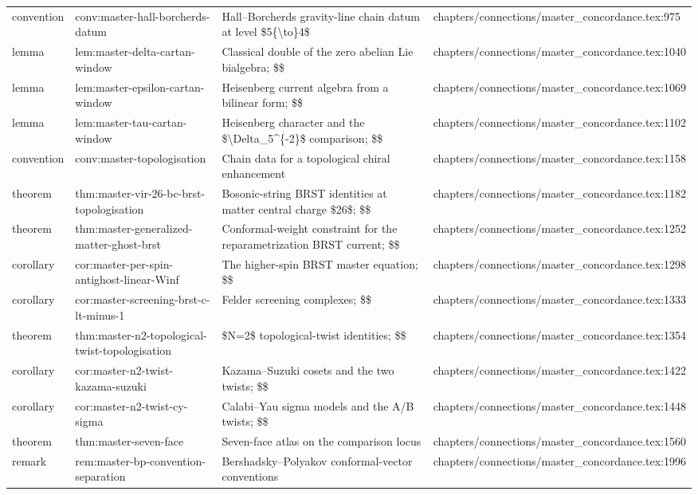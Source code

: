 \documentclass[11pt]{article}
\begin{document}
\begin{longtable}{L{0.10\textwidth}L{0.26\textwidth}L{0.42\textwidth}L{0.22\textwidth}}
convention & conv:master-hall-borcherds-datum & Hall--Borcherds gravity-line chain datum at level \$5\{\textbackslash{}to\}4\$ & chapters/connections/master\_concordance.tex:975\\
lemma & lem:master-delta-cartan-window & Classical double of the zero abelian Lie bialgebra; \$\$ & chapters/connections/master\_concordance.tex:1040\\
lemma & lem:master-epsilon-cartan-window & Heisenberg current algebra from a bilinear form; \$\$ & chapters/connections/master\_concordance.tex:1069\\
lemma & lem:master-tau-cartan-window & Heisenberg character and the \$\textbackslash{}Delta\_5\textasciicircum{}\{-2\}\$ comparison; \$\$ & chapters/connections/master\_concordance.tex:1102\\
convention & conv:master-topologisation & Chain data for a topological chiral enhancement & chapters/connections/master\_concordance.tex:1158\\
theorem & thm:master-vir-26-bc-brst-topologisation & Bosonic-string BRST identities at matter central charge \$26\$; \$\$ & chapters/connections/master\_concordance.tex:1182\\
theorem & thm:master-generalized-matter-ghost-brst & Conformal-weight constraint for the reparametrization BRST current; \$\$ & chapters/connections/master\_concordance.tex:1252\\
corollary & cor:master-per-spin-antighost-linear-Winf & The higher-spin BRST master equation; \$\$ & chapters/connections/master\_concordance.tex:1298\\
corollary & cor:master-screening-brst-c-lt-minus-1 & Felder screening complexes; \$\$ & chapters/connections/master\_concordance.tex:1333\\
theorem & thm:master-n2-topological-twist-topologisation & \$N=2\$ topological-twist identities; \$\$ & chapters/connections/master\_concordance.tex:1354\\
corollary & cor:master-n2-twist-kazama-suzuki & Kazama--Suzuki cosets and the two twists; \$\$ & chapters/connections/master\_concordance.tex:1422\\
corollary & cor:master-n2-twist-cy-sigma & Calabi--Yau sigma models and the A/B twists; \$\$ & chapters/connections/master\_concordance.tex:1448\\
theorem & thm:master-seven-face & Seven-face atlas on the comparison locus & chapters/connections/master\_concordance.tex:1560\\
remark & rem:master-bp-convention-separation & Bershadsky--Polyakov conformal-vector conventions & chapters/connections/master\_concordance.tex:1996\\

\end{longtable}
\end{document}
